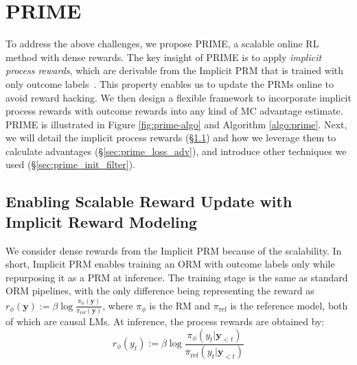\section{PRIME}


To address the above challenges, we propose PRIME, a scalable online RL method with dense rewards.
The key insight of PRIME is to apply \textit{implicit process rewards}, which are derivable from the Implicit PRM that is trained with only outcome labels~\citep{yuan2024freeprocessrewardsprocess}.
This property enables us to update the PRMs online to avoid reward hacking. 
We then design a flexible framework to incorporate implicit process rewards with outcome rewards into any kind of MC advantage estimate.
PRIME is illustrated in Figure \ref{fig:prime-algo} and Algorithm \ref{algo:prime}.
Next, we will detail the implicit process rewards (\S \ref{sec:prime_prm}) and how we leverage them to calculate advantages (\S \ref{sec:prime_loss_adv}), and introduce other techniques we used (\S \ref{sec:prime_init_filter}).



\subsection{Enabling Scalable Reward Update with Implicit Reward Modeling}
\label{sec:prime_prm}

We consider dense rewards from the Implicit PRM because of the scalability. 
In short, Implicit PRM enables training an ORM with outcome labels only while repurposing it as a PRM at inference. 
The training stage is the same as standard ORM pipelines, with the only difference being representing the reward as $r_\phi(\mathbf{y}):= \beta \log \frac{\pi_\phi(\mathbf{y})}{\pi_\text{ref}(\mathbf{y})}$, where $\pi_\phi$ is the RM and $\pi_\text{ref}$ is the reference model, both of which are causal LMs. At inference, the process rewards are obtained by:
\begin{equation}
\label{eq:pr}
    r_\phi(y_t) := \beta \log \frac{\pi_\phi(y_{t}|\mathbf{y}_{<t})}{\pi_\text{ref}(y_{t}|\mathbf{y}_{<t})}
\end{equation}




